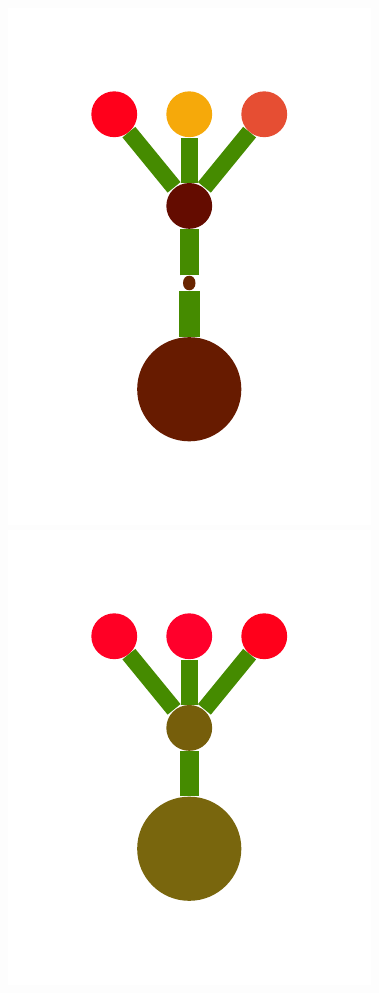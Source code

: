 \documentclass[a4paper,10pt]{article}
\begin{document}
\begin{figure}[t]
  \includegraphics[scale=.26]{./figures/2-2-initProgram-6.pdf}
  \includegraphics[scale=.26]{./figures/2-2-initProgram-8.pdf}

\end{figure}
\end{document}
